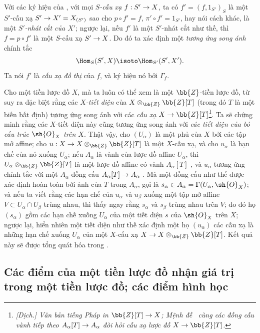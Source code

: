 \documentclass[oneside]{amsart}
\makeatletter
\newcommand{\ega@arrow}[2]{\mathchoice{#1}{#2}{#2}{#2}}
\renewcommand{\to}{\ega@arrow{\longrightarrow}{\rightarrow}}
\let\EGAOriginalLabel\label
\renewcommand{\label}[1]{\phantomsection\EGAOriginalLabel{#1}}
\makeatother
\begin{document}
\begin{env}[3.3.14]
\label{I.3.3.14}
Với các ký hiệu của , với mọi \emph{$S$-cấu xạ}
$f:S'\to X$, ta có $f'=(f,1_{S'})_S$ là một $S'$-cấu xạ
$S'\to X'=X_{(S')}$ sao cho $p\circ f'=f$, $\pi'\circ f'=1_{S'}$, hay nói
cách khác, là một \emph{$S'$-nhát cắt của $X'$}; ngược lại, nếu $f'$ là một
$S'$-nhát cắt như thế, thì $f=p\circ f'$ là một $S$-cấu xạ $S'\to X$. Do đó
ta xác định một \emph{tương ứng song ánh} chính tắc
\[
  \Hom_S(S',X)\isoto\Hom_{S'}(S',X').
\]
Ta nói $f'$ là \emph{cấu xạ đồ thị} của $f$, và ký hiệu nó bởi
$\Gamma_f$.
\end{env}

\begin{env}[3.3.15]
\label{I.3.3.15}
Cho một tiền lược đồ $X$, mà ta luôn có thể xem là một
$\bb{Z}$-tiền lược đồ, từ  suy ra đặc biệt rằng các
\emph{$X$-tiết diện} của $X\otimes_\bb{Z}\bb{Z}[T]$ (trong đó $T$ là một
biến bất định) tương ứng song ánh với các \emph{cấu xạ}
$X\to\bb{Z}[T]$\footnote{\emph{[Dịch.] Văn bản tiếng Pháp in
$\bb{Z}[T]\to X$; Mệnh đề~ cùng các đồng cấu vành tiếp theo
$A_\alpha[T]\to A_\alpha$ đòi hỏi cấu xạ lược đồ
$X\to\bb{Z}[T]$.}}. Ta sẽ chứng minh rằng các $X$-tiết diện này cũng tương
ứng song ánh với \emph{các tiết diện của bó cấu trúc $\sh{O}_X$ trên $X$}.
Thật vậy, cho $(U_\alpha)$ là một phủ của $X$ bởi các tập mở affine; cho
$u:X\to X\otimes_\bb{Z}\bb{Z}[T]$ là một $X$-cấu xạ, và cho $u_\alpha$ là
hạn chế của nó xuống $U_\alpha$; nếu $A_\alpha$ là vành của lược đồ affine
$U_\alpha$, thì $U_\alpha\otimes_\bb{Z}\bb{Z}[T]$ là một lược đồ affine có
vành $A_\alpha[T]$ , và $u_\alpha$ tương ứng chính tắc với một
$A_\alpha$-đồng cấu $A_\alpha[T]\to A_\alpha$ . Mà một đồng
cấu như thế được xác định hoàn toàn bởi ảnh của $T$ trong $A_\alpha$, gọi là
$s_\alpha\in A_\alpha=\Gamma(U_\alpha,\sh{O}_X)$; và nếu ta viết rằng các hạn
chế của $u_\alpha$ và $u_\beta$ xuống một tập mở affine
$V\subset U_\alpha\cap U_\beta$ trùng nhau, thì thấy ngay rằng $s_\alpha$ và
$s_\beta$ trùng nhau trên $V$; do đó họ $(s_\alpha)$ gồm các hạn chế xuống
$U_\alpha$ của một tiết diện $s$ của $\sh{O}_X$ trên $X$; ngược lại, hiển
nhiên một tiết diện như thế xác định một họ $(u_\alpha)$ các cấu xạ là những
hạn chế xuống $U_\alpha$ của một $X$-cấu xạ
$X\to X\otimes_\bb{Z}\bb{Z}[T]$. Kết quả này sẽ được tổng quát hóa trong
.
\end{env}

\subsection{Các điểm của một tiền lược đồ nhận giá trị trong một tiền lược đồ; các điểm hình học}
\label{subsection:I.3.4}
\end{document}
